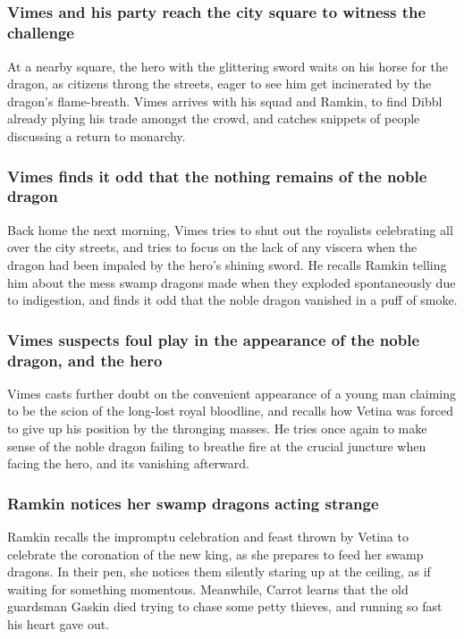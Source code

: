 \subsection{}
\subsubsection{\Gls{Vimes} and his party reach the city square to witness the challenge}
At a nearby square, the hero with the glittering sword waits on his horse for the dragon, as
citizens throng the streets, eager to see him get incinerated by the dragon's flame-breath.
\Gls{Vimes} arrives with his squad and \Gls{Ramkin}, to find \Gls{Dibbl} already plying his trade
amongst the crowd, and catches snippets of people discussing a return to monarchy.

\subsubsection{\Gls{Vimes} finds it odd that the nothing remains of the noble dragon}
Back home the next morning, \Gls{Vimes} tries to shut out the royalists celebrating all over the
city streets, and tries to focus on the lack of any viscera when the dragon had been impaled by
the hero's shining sword. He recalls \Gls{Ramkin} telling him about the mess swamp dragons made when
they exploded spontaneously due to indigestion, and finds it odd that the noble dragon vanished in
a puff of smoke.

\subsubsection{\Gls{Vimes} suspects foul play in the appearance of the noble dragon, and the hero}
\Gls{Vimes} casts further doubt on the convenient appearance of a young man claiming to be the scion
of the long-lost royal bloodline, and recalls how \Gls{Vetina} was forced to give up his position
by the thronging masses. He tries once again to make sense of the noble dragon failing to breathe
fire at the crucial juncture when facing the hero, and its vanishing afterward.

\subsubsection{\Gls{Ramkin} notices her swamp dragons acting strange}
\Gls{Ramkin} recalls the impromptu celebration and feast thrown by \Gls{Vetina} to celebrate the
coronation of the new king, as she prepares to feed her swamp dragons. In their pen, she notices
them silently staring up at the ceiling, as if waiting for something momentous. Meanwhile,
\Gls{Carrot} learns that the old guardsman \Gls{Gaskin} died trying to chase some petty thieves, and
running so fast his heart gave out.

